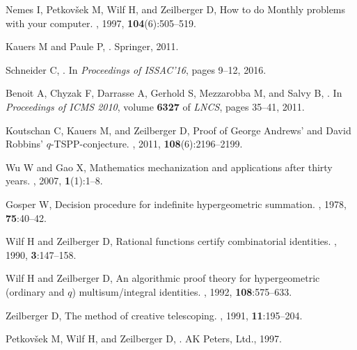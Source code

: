 \documentclass{jssc}
\begin{document}
\begin{thebibliography}{100}

Nemes I, Petkov{\v s}ek M, Wilf H, and Zeilberger D,
\newblock How to do {M}onthly problems with your computer.
, 1997, {\bf 104}(6):505--519.

Kauers M and Paule P,
.
\newblock Springer, 2011.

Schneider C,
.
\newblock In {\it Proceedings of ISSAC'16}, pages 9--12, 2016.

 Benoit A, Chyzak F, Darrasse A, Gerhold S, Mezzarobba M, and Salvy B,
.
\newblock In {\it Proceedings of ICMS 2010}, volume {\bf 6327} of {\it LNCS}, pages
  35--41, 2011.

Koutschan C, Kauers M, and Zeilberger D,
\newblock Proof of {G}eorge {A}ndrews' and {D}avid {R}obbins'
  $q$-{TSPP}-conjecture.
, 2011,
  {\bf 108}(6):2196--2199.

Wu W and Gao X,
\newblock Mathematics mechanization and applications after thirty years.
, 2007, {\bf 1}(1):1--8.

Gosper W,
\newblock Decision procedure for indefinite hypergeometric summation.
, 1978, {\bf 75}:40--42.

Wilf H and Zeilberger D,
\newblock Rational functions certify combinatorial identities.
, 1990, {\bf 3}:147--158.

Wilf H and Zeilberger D,
\newblock An algorithmic proof theory for hypergeometric (ordinary and $q$)
  multisum/integral identities.
, 1992, {\bf 108}:575--633.

Zeilberger D,
\newblock The method of creative telescoping.
, 1991, {\bf 11}:195--204.

Petkov{\v s}ek M, Wilf H, and Zeilberger D,
.
\newblock AK Peters, Ltd., 1997.


\end{thebibliography}
\end{document}
